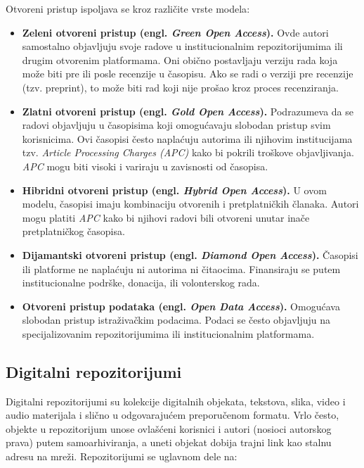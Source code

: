 \documentclass{article}
\begin{document}
Otvoreni pristup ispoljava se kroz različite vrste modela\cite{eve2014open}:

\begin{itemize}
    \item \textbf{Zeleni otvoreni pristup (engl. \textit{Green Open Access}).} Ovde autori samostalno objavljuju svoje radove u institucionalnim repozitorijumima ili drugim otvorenim platformama. Oni obično postavljaju verziju rada koja može biti pre ili posle recenzije u časopisu. Ako se radi o verziji pre recenzije (tzv. preprint), to može biti rad koji nije prošao kroz proces recenziranja.
    \item \textbf{Zlatni otvoreni pristup (engl. \textit{Gold Open Access}).} Podrazumeva da se radovi objavljuju u časopisima koji omogućavaju slobodan pristup svim korisnicima. Ovi časopisi često naplaćuju autorima ili njihovim institucijama tzv. \textit{Article Processing Charges (APC)} kako bi pokrili troškove objavljivanja. \textit{APC} mogu biti visoki i variraju u zavisnosti od časopisa.
    \item \textbf{Hibridni otvoreni pristup (engl. \textit{Hybrid Open Access}).} U ovom modelu, časopisi imaju kombinaciju otvorenih i pretplatničkih članaka. Autori mogu platiti \textit{APC} kako bi njihovi radovi bili otvoreni unutar inače pretplatničkog časopisa.
    \item \textbf{Dijamantski otvoreni pristup (engl. \textit{Diamond Open Access}).} Časopisi ili platforme ne naplaćuju ni autorima ni čitaocima. Finansiraju se putem institucionalne podrške, donacija, ili volonterskog rada.
    \item \textbf{Otvoreni pristup podataka (engl. \textit{Open Data Access}).} Omogućava slobodan pristup istraživačkim podacima. Podaci se često objavljuju na specijalizovanim repozitorijumima ili institucionalnim platformama.
\end{itemize}


\subsection{Digitalni repozitorijumi}

Digitalni repozitorijumi su kolekcije digitalnih objekata, tekstova, slika, video i audio materijala i slično u odgovarajućem preporučenom formatu. Vrlo često, objekte u repozitorijum unose ovlašćeni korisnici i autori (nosioci autorskog prava) putem samoarhiviranja, a uneti objekat dobija trajni link kao stalnu adresu na mreži. Repozitorijumi se uglavnom dele na:
\end{document}
